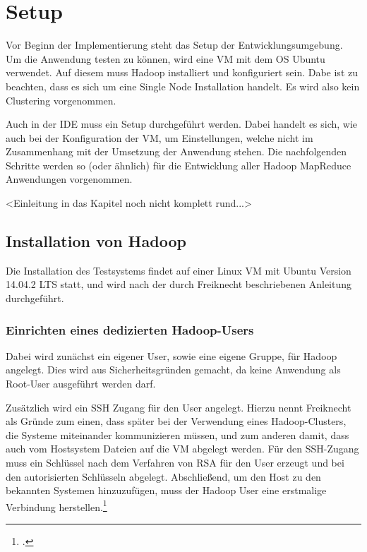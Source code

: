 
\chapter{Setup}\label{cha:Setup}
Vor Beginn der Implementierung steht das Setup der Entwicklungsumgebung. Um die Anwendung testen zu können, wird eine \ac{VM} mit dem \ac{OS} Ubuntu verwendet. Auf diesem muss Hadoop installiert und konfiguriert sein. Dabe ist zu beachten, dass es sich um eine Single Node Installation handelt. Es wird also kein Clustering vorgenommen.

Auch in der \ac{IDE} muss ein Setup durchgeführt werden. Dabei handelt es sich, wie auch bei der Konfiguration der \ac{VM}, um Einstellungen, welche nicht im Zusammenhang mit der Umsetzung der Anwendung stehen. Die nachfolgenden Schritte werden so (oder ähnlich) für die Entwicklung aller Hadoop MapReduce Anwendungen vorgenommen.

<Einleitung in das Kapitel noch nicht komplett rund...>

\section{Installation von Hadoop}\label{sec:InstallationHadoop}
Die Installation des Testsystems findet auf einer Linux \ac{VM} mit Ubuntu Version 14.04.2 \ac{LTS} statt, und wird nach der durch Freiknecht beschriebenen Anleitung durchgeführt. 

\subsection{Einrichten eines dedizierten Hadoop-Users}
Dabei wird zunächst ein eigener User, sowie eine eigene Gruppe, für Hadoop angelegt. Dies wird aus Sicherheitsgründen gemacht, da keine Anwendung als Root-User ausgeführt werden darf.

Zusätzlich wird ein \ac{SSH} Zugang für den User angelegt. Hierzu nennt Freiknecht als Gründe zum einen, dass später bei der Verwendung eines Hadoop-Clusters, die Systeme miteinander kommunizieren müssen, und zum anderen damit, dass auch vom Hostsystem Dateien auf die \ac{VM} abgelegt werden. Für den \ac{SSH}-Zugang muss ein Schlüssel nach dem Verfahren von \ac{RSA} für den User erzeugt und bei den autorisierten Schlüsseln abgelegt. Abschließend, um den Host zu den bekannten Systemen hinzuzufügen, muss der Hadoop User eine erstmalige Verbindung herstellen.\footcite[Vgl.][S. 30 f.]{Freiknecht.2014}

